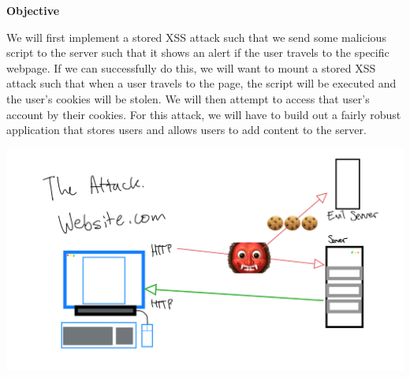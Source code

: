 \documentclass[11pt]{article}
\begin{document}
\textbf{Objective}

We will first implement a stored XSS attack such that we send some malicious script to the server such that it shows an alert if the user travels to the specific webpage. If we can successfully do this, we will want to mount a stored XSS attack such that when a user travels to the page, the script will be executed and the user's cookies will be stolen. We will then attempt to access that user's account by their cookies. For this attack, we will have to build out a fairly robust application that stores users and allows users to add content to the server.

\includegraphics[width = 14cm]{attack.png}
\end{document}

